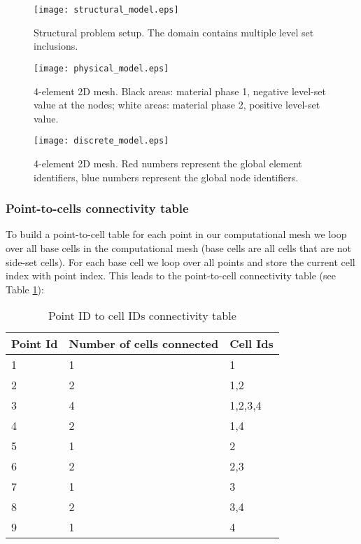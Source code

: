 \begin{figure}[htbp]
	\centering
	\texttt{[image: structural\_model.eps]}
	\caption[Structural problem setup.]{Structural problem setup. The domain contains multiple level set inclusions.}
	\label{fig:structural_model}
\end{figure}

\begin{figure}[htbp]
	\centering
	\texttt{[image: physical\_model.eps]}
	\caption[XFEM implementation example physical model]{4-element 2D mesh. Black areas: material phase 1, negative level-set value at the nodes; white areas: material phase 2, positive level-set value.}
	\label{fig:physical_model}
\end{figure}

\begin{figure}[htbp]
	\centering
	\texttt{[image: discrete\_model.eps]}
	\caption[XFEM implementation example discrete model]{4-element 2D mesh. Red numbers represent the global element identifiers, blue numbers represent the global node identifiers.}
	\label{fig:discrete_model}
\end{figure}


\subsubsection{Point-to-cells connectivity table}

To build a point-to-cell table for each point in our computational mesh we loop over all base cells in the computational mesh (base cells are all cells that are not side-set cells). For each base cell we loop over all points and store the current cell index with point index. This leads to the point-to-cell connectivity table (see Table \ref{tab:point-to-cell-connectivity-table}):

\begin{table}[htbp]
	\centering
		\begin{tabular}{| l | l | l |}
		\hline
		Point Id & Number of cells connected & Cell Ids \\ \hline
		1 & 1 & 1		\\ \hline
		2 & 2 & 1,2		\\ \hline
		3 & 4 & 1,2,3,4 \\ \hline
		4 & 2 & 1,4 	\\ \hline
		5 & 1 & 2 		\\ \hline
		6 & 2 & 2,3 	\\ \hline
		7 & 1 & 3 		\\ \hline
		8 & 2 & 3,4 	\\ \hline
		9 & 1 & 4   	\\ \hline
		\end{tabular}
	\caption[Point ID to cell IDs connectivity table]{Point ID to cell IDs connectivity table}
	\label{tab:point-to-cell-connectivity-table}
\end{table}

